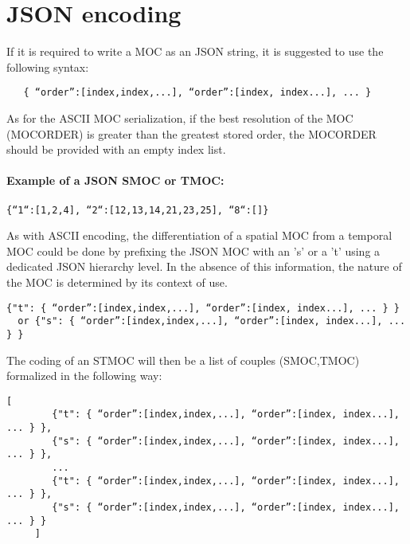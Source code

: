 \section{JSON encoding}
If it is required to write a MOC as an JSON string,
it is suggested to use the following syntax:

\par\noindent
\begin{Verbatim}
   { “order”:[index,index,...], “order”:[index, index...], ... }
\end{Verbatim}

As for the ASCII MOC serialization, if the best resolution
of the MOC (MOCORDER) is greater than the greatest stored order, the
MOCORDER should be provided with an empty index list.

\paragraph{Example of a JSON SMOC or TMOC:}
\par\noindent
\begin{Verbatim}[frame=single]
    {“1“:[1,2,4], “2“:[12,13,14,21,23,25], “8“:[]}
\end{Verbatim}

As with ASCII encoding, the differentiation of a spatial MOC from a temporal MOC could be done by prefixing the JSON MOC with an 's' or a 't' using a dedicated JSON hierarchy level. In the absence of this information, the nature of the MOC is determined by its context of use.

\par\noindent
\begin{Verbatim}[frame=single, xrightmargin=-3cm] 
     {"t": { “order”:[index,index,...], “order”:[index, index...], ... } }
  or {"s": { “order”:[index,index,...], “order”:[index, index...], ... } }
\end{Verbatim}


The coding of an STMOC will then be a list of couples (SMOC,TMOC) formalized in the following way:
\par\noindent
\begin{Verbatim}[frame=single, xrightmargin=-3cm] 
     [
        {"t": { “order”:[index,index,...], “order”:[index, index...], ... } },
        {"s": { “order”:[index,index,...], “order”:[index, index...], ... } },
        ...
        {"t": { “order”:[index,index,...], “order”:[index, index...], ... } },
        {"s": { “order”:[index,index,...], “order”:[index, index...], ... } }
     ]
\end{Verbatim}

